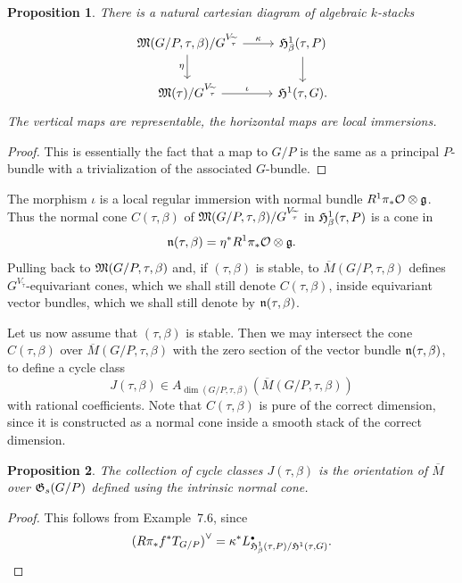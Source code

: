 \documentclass{article}
\newtheorem{prop}{Proposition}
\renewcommand{\tilde}{\widetilde}
\newcommand{\dual}[1]{{{#1}^{\vee}}}
\newcommand{\upst}{^{\ast}}
\newcommand{\lst}{_{\ast}}
\newcommand{\com}{^{\scriptscriptstyle\bullet}}
\newcommand{\GG}{{\frak G}}
\newcommand{\MM}{{\frak M}}
\newcommand{\HH}{{\frak H}}
\newcommand{\Gg}{{\frak g}}
\newcommand{\Nn}{{\frak n}}
\renewcommand{\O}{{\cal O}}
\newcommand{\ol}{\overline}
\newcommand{\ldiag}[1]%
       {\makebox[0cm]{${\scriptstyle#1}\downarrow\phantom{\scriptstyle#1}$}}
\newcommand{\rdiag}[1]%
       {\makebox[0cm]{$\phantom{\scriptstyle#1}\downarrow{\scriptstyle#1}$}}
\newcommand{\comdia}[9]{%
\begin{array}{ccc}
#1 & \stackrel{#2}{\longrightarrow} & #3 \\
\ldiag{#4} & #5 & \rdiag{#6} \\
#7 & \stackrel{#8}{\longrightarrow} & #9
\end{array}}
\begin{document}
\begin{prop} \label{mcd}
There is a natural cartesian diagram of algebraic $k$-stacks
\[\begin{tikzcd}
  \MM(G/P,\tau,\beta)/G^{V_{\tilde{\tau}}} \dar["\eta"'] \rar["\kappa"] & \HH^1_{\beta}(\tau,P) \dar \\
  \MM(\tau)/G^{V_{\tilde{\tau}}} \rar["\iota"] & \HH^1(\tau,G).
\end{tikzcd}\]
The vertical maps are
representable, the horizontal maps are local immersions.
\end{prop}
\begin{proof}
This is essentially the fact that a map to $G/P$ is the same as a
principal $P$-bundle with a trivialization of the associated
$G$-bundle.
\end{proof}

The morphism $\iota$ is a local regular immersion with normal bundle
$R^1\pi\lst\O\otimes\Gg$.  Thus the normal cone $C(\tau,\beta)$ of
$\MM(G/P,\tau,\beta)/G^{V_{\tilde{\tau}}}$ in
$\HH^1_{\beta}(\tau,P)$ is a cone in
\[\Nn(\tau,\beta)=\eta\upst R^1\pi\lst\O\otimes\Gg.\]
Pulling back to $\MM(G/P,\tau,\beta)$ and, if $(\tau,\beta)$ is
stable, to $\ol{M}(G/P,\tau,\beta)$ defines
$G^{V_{\tilde{\tau}}}$-equivariant cones, which we shall still
denote $C(\tau,\beta)$, inside equivariant vector bundles, which we
shall still denote by $\Nn(\tau,\beta)$.

Let us now assume that $(\tau,\beta)$ is stable. Then we may intersect
the cone $C(\tau,\beta)$ over $\ol{M}(G/P,\tau,\beta)$ with the zero
section of the vector bundle $\Nn(\tau,\beta)$, to define a cycle
class
\[J(\tau,\beta)\in A_{\dim(G/P,\tau,\beta)}(\ol{M}(G/P,\tau,\beta))\]
with rational coefficients. Note that $C(\tau,\beta)$ is pure of the
correct dimension, since it is constructed as a normal cone inside a
smooth stack of the correct dimension.

\begin{prop} \label{tmt}
The collection of cycle classes $J(\tau,\beta)$ is the orientation of
$\ol{M}$ over $\GG_s(G/P)$ defined using the intrinsic normal cone.
\end{prop}
\begin{proof}
This follows from \cite{BF} Example~7.6, since
\[
\dual{(R\pi\lst f\upst T_{G/P})}=\kappa\upst
L\com_{\HH^1_{\beta}(\tau,P)/\HH^1(\tau,G)}. \qedhere
\]
\end{proof}
\end{document}
